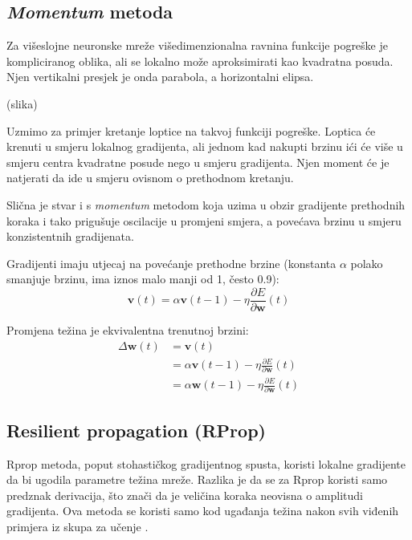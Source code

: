 \documentclass[times, utf8, diplomski, numeric]{fer}
\begin{document}
\subsection{\emph{Momentum} metoda}

Za višeslojne neuronske mreže višedimenzionalna ravnina funkcije pogreške je kompliciranog oblika, ali se lokalno može aproksimirati kao kvadratna posuda. Njen vertikalni presjek je onda parabola, a horizontalni elipsa.

(slika)

Uzmimo za primjer kretanje loptice na takvoj funkciji pogreške. Loptica će krenuti u smjeru lokalnog gradijenta, ali jednom kad nakupti brzinu ići će više u smjeru centra kvadratne posude nego u smjeru gradijenta. Njen moment će je natjerati da ide u smjeru ovisnom o prethodnom kretanju.

Slična je stvar i s \emph{momentum} metodom koja uzima u obzir gradijente prethodnih koraka i tako prigušuje oscilacije u promjeni smjera, a povećava brzinu u smjeru konzistentnih gradijenata.

Gradijenti imaju utjecaj na povećanje prethodne brzine (konstanta $\alpha$ polako smanjuje brzinu, ima iznos malo manji od 1, često 0.9):
\begin{equation}
\boldsymbol{v}(t) = \alpha \boldsymbol{v}(t-1) - \eta \frac{\partial E}{\partial \boldsymbol{w}}(t)
\end{equation}

Promjena težina je ekvivalentna trenutnoj brzini:
\begin{equation}
\begin{split}
	\Delta \boldsymbol{w}(t) &= \boldsymbol{v}(t) \\
		&= \alpha \boldsymbol{v}(t-1) - \eta \frac{\partial E}{\partial \boldsymbol{w}}(t) \\
		&= \alpha \boldsymbol{w}(t-1) - \eta \frac{\partial E}{\partial \boldsymbol{w}}(t)
\end{split}
\end{equation}

\subsection{Resilient propagation (RProp)}

Rprop metoda, poput stohastičkog gradijentnog spusta, koristi lokalne gradijente da bi ugodila parametre težina mreže. Razlika je da se za Rprop koristi samo predznak  derivacija, što znači da je veličina koraka neovisna o amplitudi gradijenta. Ova metoda se koristi samo kod ugađanja težina nakon svih viđenih primjera iz skupa za učenje .
\end{document}

